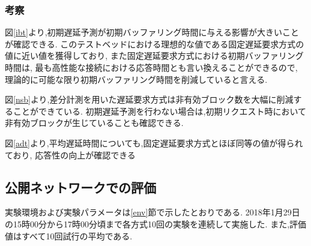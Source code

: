 \documentclass[a4j,12pt]{gradthesis_utf8}
\begin{document}
\clearpage

\subsubsection{考察}
図\ref{ibt}より,初期遅延予測が初期バッファリング時間に与える影響が大きいことが確認できる.
このテストベッドにおける理想的な値である固定遅延要求方式の値に近い値を獲得しており,
また固定遅延要求方式における初期バッファリング時間は,
最も高性能な接続における応答時間とも言い換えることができるので,
理論的に可能な限り初期バッファリング時間を削減していると言える.

図\ref{nsb}より,差分計測を用いた遅延要求方式は非有効ブロック数を大幅に削減することができている.
初期遅延予測を行わない場合は,初期リクエスト時において非有効ブロックが生じていることも確認できる.

図\ref{adt}より,平均遅延時間についても,固定遅延要求方式とほぼ同等の値が得られており,
応答性の向上が確認できる

\clearpage

\subsection{公開ネットワークでの評価}
実験環境および実験パラメータは\ref{env}節で示したとおりである.
2018年1月29日の15時00分から17時00分頃まで各方式10回の実験を連続して実施した.
また,評価値はすべて10回試行の平均である.
\end{document}
